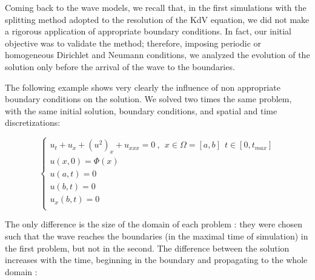 \indent Coming back to the wave models, we recall that, in the first simulations with the splitting method adopted to the resolution of the KdV equation, we did not make a rigorous application of appropriate boundary conditions. In fact, our initial objective was to validate the method; therefore, imposing periodic or homogeneous Dirichlet and Neumann conditions, we analyzed the evolution of the solution only before the arrival of the wave to the boundaries.

\indent The following example shows very clearly the influence of non appropriate boundary conditions on the solution. We solved two times the same problem, with the same initial solution, boundary conditions, and spatial and time discretizations: 

\begin{equation}
    \begin{cases}
    u_t + u_x + (u^2)_x + u_{xxx} = 0 \ , \ \ x \in \Omega=[a,b] \ \ t \in [0, t_{max}] \\
    u(x,0) = \Phi(x) \\
    u(a,t) = 0 \\
    u(b,t) = 0 \\
    u_x(b,t) = 0  \\ 
    \end{cases}
\end{equation}

\indent The only difference is the size of the domain of each problem : they were chosen such that the wave reaches the boundaries (in the maximal time of simulation) in the first problem, but not in the second. The difference between the solution increases with the time, beginning in the boundary and propagating to the whole domain :

